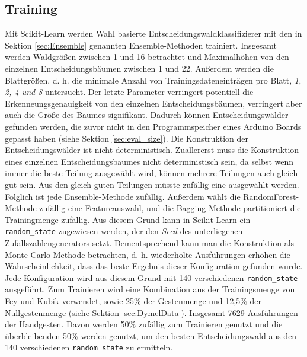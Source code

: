 \subsection{Training}
\label{sec:Training}
Mit Scikit-Learn werden Wahl basierte Entscheidungswaldklassifizierer mit den in Sektion \ref{sec:Ensemble} genannten Ensemble-Methoden trainiert. Insgesamt werden Waldgrößen zwischen 1 und 16 betrachtet und
Maximalhöhen von den einzelnen Entscheidungsbäumen zwischen 1 und 22. Außerdem werden die Blattgrößen, d. h. die minimale Anzahl von Trainingsdateneinträgen pro Blatt, \textit{1, 2, 4 und 8} untersucht.
\newline
\newline
Der letzte Parameter verringert potentiell die Erkenneungsgenauigkeit von den einzelnen Entscheidungsbäumen, verringert aber auch die Größe des Baumes signifikant.
Dadurch können Entscheidungswälder gefunden werden, die zuvor nicht in den Programmspeicher eines Arduino Boards gepasst haben (siehe Sektion \ref{sec:eval_size}).
\newline
\newline
Die Konstruktion der Entscheidungswälder ist nicht deterministisch. Zuallererst muss die Konstruktion eines einzelnen Entscheidungsbaumes nicht deterministisch sein, da selbst wenn immer die beste Teilung
ausgewählt wird, können mehrere Teilungen auch gleich gut sein. Aus den gleich guten Teilungen müsste zufällig eine ausgewählt werden. Folglich ist jede Ensemble-Methode zufällig. Außerdem wählt die RandomForest-Methode
zufällig eine Featureauswahl, und die Bagging-Methode partitioniert die Trainingmenge zufällig. Aus diesem Grund kann in Scikit-Learn ein \texttt{random\_state} zugewiesen werden, der den \textit{Seed} des
unterliegenen Zufallszahlengenerators setzt.
\newline
\newline
Dementsprechend kann man die Konstruktion als Monte Carlo Methode betrachten, d. h. wiederholte Ausführungen erhöhen die Wahrscheinlichkeit, dass das beste Ergebnis dieser Konfiguration gefunden wurde.
Jede Konfiguration wird aus diesem Grund mit 140 verschiedenen \texttt{random\_state} ausgeführt.
\newline
\newline
Zum Trainieren wird eine Kombination aus der Trainingsmenge von Fey und Kubik verwendet, sowie 25\% der Gestenmenge und 12,5\% der Nullgestenmenge (siehe Sektion \ref{sec:DymelData}). Insgesamt 7629
Ausführungen der Handgesten. Davon werden 50\% zufällig zum Trainieren genutzt und die überbleibenden 50\% werden genutzt, um den besten Entscheidungswald aus den 140 verschiedenen \texttt{random\_state}
zu ermitteln.

